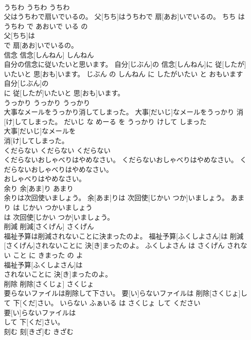 \documentclass[8pt]{extreport}
\begin{document}
\begin{CJK}{UTF8}{min}
\\	うちわ	うちわ	うちわ	
\\	父はうちわで扇いでいるの。	父[ちち]はうちわで 扇[あお]いでいるの。	ちち は うちわ で あおいで いる の	
\\	父[ちち]は
\\	で 扇[あお]いでいるの。			
\\	信念	信念[しんねん]	しんねん	
\\	自分の信念に従いたいと思います。	自分[じぶん]の 信念[しんねん]に 従[したが]いたいと 思[おも]います。	じぶん の しんねん に したがいたい と おもいます	
\\	自分[じぶん]の
\\	に 従[したが]いたいと 思[おも]います。			
\\	うっかり	うっかり	うっかり	
\\	大事なメールをうっかり消してしまった。	大事[だいじ]なメールをうっかり 消[け]してしまった。	だいじ な めーる を うっかり けして しまった	
\\	大事[だいじ]なメールを
\\	消[け]してしまった。			
\\	くだらない	くだらない	くだらない	
\\	くだらないおしゃべりはやめなさい。	くだらないおしゃべりはやめなさい。	くだらないおしゃべりはやめなさい。	
\\	おしゃべりはやめなさい。			
\\	余り	余[あま]り	あまり	
\\	余りは次回使いましょう。	余[あま]りは 次回使[じかい つか]いましょう。	あまり は じかい つかいましょう	
\\	は 次回使[じかい つか]いましょう。			
\\	削減	削減[さくげん]	さくげん	
\\	福祉予算は削減されないことに決まったのよ。	福祉予算[ふくしよさん]は 削減[さくげん]されないことに 決[き]まったのよ。	ふくしよさん は さくげん されない こと に きまった の よ	
\\	福祉予算[ふくしよさん]は
\\	されないことに 決[き]まったのよ。			
\\	削除	削除[さくじょ]	さくじょ	
\\	要らないファイルは削除して下さい。	要[い]らないファイルは 削除[さくじょ]して 下[くだ]さい。	いらない ふぁいる は さくじょ して ください	
\\	要[い]らないファイルは
\\	して 下[くだ]さい。			
\\	刻む	刻[きざ]む	きざむ	

\end{CJK}
\end{document}
